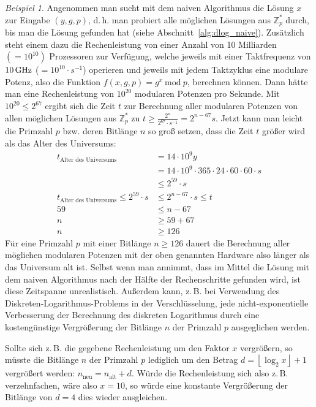 \documentclass[
  a4paper,
  11pt,
]{scrartcl}
\theoremstyle{plain}
\theoremstyle{definition}
\theoremstyle{remark}
\newtheorem{beispiel}{Beispiel}
\newcommand{\Z}{\mathbb{Z}}
\newcommand{\Mod}[1]{\ \mathrm{mod}\ #1}
\begin{document}
\begin{beispiel}
  Angenommen man sucht mit dem naiven Algorithmus die Lösung $x$ zur Eingabe
  $(y, g, p)$, d.\,h. man probiert alle möglichen Lösungen aus $\Z_p^*$ durch,
  bis man die Lösung gefunden hat (siehe Abschnitt~\ref{alg:dlog_naive}).
  Zusätzlich steht einem dazu die Rechenleistung von einer Anzahl von 10
  Milliarden $(=10^{10})$ Prozessoren zur Verfügung, welche jeweils mit einer
  Taktfrequenz von $10 \text{\,GHz}$ ($= 10^{10} \cdot s^{-1}$) operieren und
  jeweils mit jedem Taktzyklus eine modulare Potenz, also die Funktion $f(x, g,
  p) = g^x \Mod{p}$, berechnen können.
  Dann hätte man eine Rechenleistung von $10^{20}$ modularen Potenzen pro
  Sekunde.
  Mit $10^{20} \leq 2^{67}$ ergibt sich die Zeit $t$ zur Berechnung aller
  modularen Potenzen von allen möglichen Lösungen aus $\Z_p^*$ zu
  $t \geq \frac{2^n}{2^{67}\cdot s^{-1}}=2^{n-67} s$.
  Jetzt kann man leicht die Primzahl $p$ bzw. deren Bitlänge $n$ so groß setzen,
  dass die Zeit $t$ größer wird als das Alter des Universums:
  \begin{align*}
    t_{\text{Alter des Universums}} & = 14 \cdot 10^9 y\\
    & = 14 \cdot 10^9 \cdot 365 \cdot 24 \cdot 60\cdot 60\cdot s\\
    & \leq 2^{59}\cdot s\\
    t_{\text{Alter des Universums}} \leq 2^{59}\cdot s & \leq 2^{n-67}\cdot s \leq t\\
    59 & \leq n-67\\
    n & \geq 59+67\\
    n & \geq 126
  \end{align*}
  Für eine Primzahl $p$ mit einer Bitlänge $n \geq 126$ dauert die Berechnung
  aller möglichen modularen Potenzen mit der oben genannten Hardware also länger
  als das Universum alt ist. Selbst wenn man annimmt, dass im Mittel die Lösung
  mit dem naiven Algorithmus nach der Hälfte der Rechenschritte gefunden wird,
  ist diese Zeitspanne unrealistisch. Außerdem kann, z.\,B. bei Verwendung des
  Diskreten-Logarithmus-Problems in der Verschlüsselung, jede
  nicht-exponentielle Verbesserung der Berechnung des diskreten Logarithmus
  durch eine kostengünstige Vergrößerung der Bitlänge $n$ der Primzahl $p$
  ausgeglichen werden.

  Sollte sich z.\,B. die gegebene Rechenleistung um den Faktor $x$ vergrößern, so
  müsste die Bitlänge $n$ der Primzahl $p$ lediglich um den Betrag
  $d = \left\lfloor \log_2 x \right\rfloor + 1$ vergrößert werden:
  $n_{\text{neu}} = n_{\text{alt}} + d$. Würde die Rechenleistung sich also
  z.\,B. verzehnfachen, wäre also $x=10$, so würde eine konstante Vergrößerung
  der Bitlänge von $d=4$ dies wieder ausgleichen.


\end{beispiel}
\end{document}
